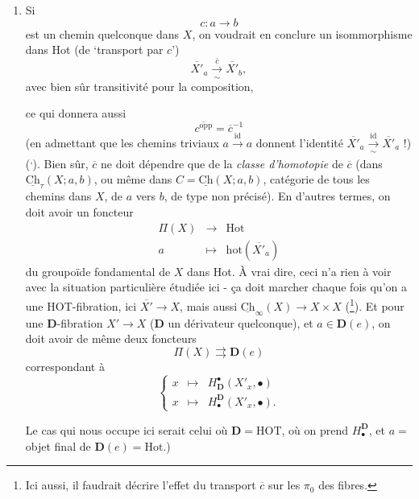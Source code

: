 \documentclass[11pt]{article}
\newcommand{\printedpage}[1]{\marginpar{\footnotesize p.~#1}}
\newcommand{\msp}[1]{\marginpar{\footnotesize [#1]}}
\newcommand{\uCh}{\underline{\mathrm{Ch}}}
\newcommand{\hot}{\mathrm{hot}}
\begin{document}
\begin{enumerate}[label={}, leftmargin=*]
\item[4$^o$)] Si
\[
c:a\longrightarrow b
\]
est un chemin quelconque dans $X$, on voudrait en conclure un isommorphisme dans Hot (de `transport par $c$') %
\[
\overline{X'}_a\xrightarrow[\sim]{\bar{c}}\overline{X'}_b,
\]
avec bien sûr transitivité pour la composition,

\msp{page 141}

ce qui donnera aussi
\[
\overline{c^{\mathrm{opp}}}=\overline{c}^{-1}
\]
(en admettant que les chemins triviaux $a\xrightarrow{\mathrm{id}}a$ donnent l'identité $\overline{X'}_a\xrightarrow[\sim]{\mathrm{id}}\overline{X'}_a$ !) (\footnotemark[32]\textsuperscript{,}\footnotemark[33]). Bien sûr, $\overline{c}$ ne doit dépendre que de la \textit{classe d'homotopie} de $\overline{c}$ (dans %
\printedpage{88}
$\uCh_\tau(X;a,b)$, ou même dans $C=\uCh(X;a,b)$, catégorie de tous les chemins dans $X$, de $a$ vers $b$, de type non précisé). En d'autres termes, on doit avoir un foncteur
\[
\begin{array}{rcl}
\Pi(X) & \longrightarrow & \mathrm{Hot}\\[4pt]
a & \longmapsto & \hot(\overline{X'}_a)
\end{array}
\]
du groupoïde fondamental de $X$ dans Hot. À vrai dire, ceci n'a rien à voir avec la situation particulière étudiée ici - ça doit marcher chaque fois qu'on a une HOT-fibration, ici $\overline{X'}\longrightarrow X$, mais aussi $\uCh_\infty(X)\longrightarrow X\times X$ (\footnote[34]{Ici aussi, il faudrait décrire l'effet du transport $\overline{c}$ sur les $\pi_0$ des fibres.}). Et pour une $\mathbf{D}$-fibration $X'\longrightarrow X$ ($\mathbf{D}$ un dérivateur quelconque), et $a\in\mathbf{D}(e)$, on doit avoir de même deux foncteurs
\[
\Pi(X)\rightrightarrows\mathbf{D}(e)
\]
correspondant à
\[
\left\{\begin{array}{lcl}
x & \longmapsto & H^\bullet_{\mathbf{D}}(X'_x,\bullet)\\[4pt]
x & \longmapsto & H_\bullet^{\mathbf{D}}(X'_x,\bullet).
\end{array}\right.
\]

\msp{page 142}

Le cas qui nous occupe ici serait celui où $\mathbf{D}=\mathrm{HOT}$, où on prend $H^{\mathbf{D}}_\bullet$, et $a=$ objet final de $\mathbf{D}(e)=\mathrm{Hot}$.)


\end{enumerate}
\end{document}
